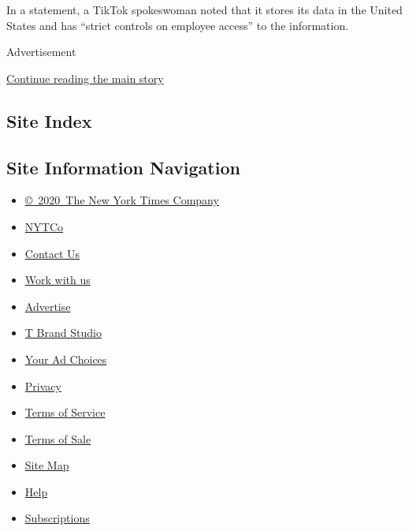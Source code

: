In a statement, a TikTok spokeswoman noted that it stores its data in
the United States and has ``strict controls on employee access'' to the
information.

Advertisement

\protect\hyperlink{after-bottom}{Continue reading the main story}

\hypertarget{site-index}{%
\subsection{Site Index}\label{site-index}}

\hypertarget{site-information-navigation}{%
\subsection{Site Information
Navigation}\label{site-information-navigation}}

\begin{itemize}
\tightlist
\item
  \href{https://help.nytimes3xbfgragh.onion/hc/en-us/articles/115014792127-Copyright-notice}{©~2020~The
  New York Times Company}
\end{itemize}

\begin{itemize}
\tightlist
\item
  \href{https://www.nytco.com/}{NYTCo}
\item
  \href{https://help.nytimes3xbfgragh.onion/hc/en-us/articles/115015385887-Contact-Us}{Contact
  Us}
\item
  \href{https://www.nytco.com/careers/}{Work with us}
\item
  \href{https://nytmediakit.com/}{Advertise}
\item
  \href{http://www.tbrandstudio.com/}{T Brand Studio}
\item
  \href{https://www.nytimes3xbfgragh.onion/privacy/cookie-policy\#how-do-i-manage-trackers}{Your
  Ad Choices}
\item
  \href{https://www.nytimes3xbfgragh.onion/privacy}{Privacy}
\item
  \href{https://help.nytimes3xbfgragh.onion/hc/en-us/articles/115014893428-Terms-of-service}{Terms
  of Service}
\item
  \href{https://help.nytimes3xbfgragh.onion/hc/en-us/articles/115014893968-Terms-of-sale}{Terms
  of Sale}
\item
  \href{https://spiderbites.nytimes3xbfgragh.onion}{Site Map}
\item
  \href{https://help.nytimes3xbfgragh.onion/hc/en-us}{Help}
\item
  \href{https://www.nytimes3xbfgragh.onion/subscription?campaignId=37WXW}{Subscriptions}
\end{itemize}
